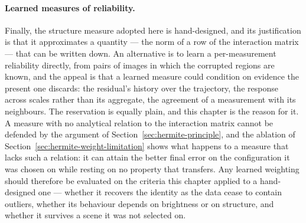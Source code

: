 \paragraph{Learned measures of reliability.}
Finally, the structure measure adopted here is hand-designed, and its
justification is that it approximates a quantity --- the norm of a row of the
interaction matrix --- that can be written down. An alternative is to learn a
per-measurement reliability directly, from pairs of images in which the
corrupted regions are known, and the appeal is that a learned measure could
condition on evidence the present one discards: the residual's history over
the trajectory, the response across scales rather than its aggregate, the
agreement of a measurement with its neighbours. The reservation is equally
plain, and this chapter is the reason for it. A measure with no analytical
relation to the interaction matrix cannot be defended by the argument of
Section~\ref{sec:hermite-principle}, and the ablation of
Section~\ref{sec:hermite-weight-limitation} shows what happens to a measure
that lacks such a relation: it can attain the better final error on the
configuration it was chosen on while resting on no property that transfers.
Any learned weighting should therefore be evaluated on the criteria this
chapter applied to a hand-designed one --- whether it recovers the identity as
the data cease to contain outliers, whether its behaviour depends on
brightness or on structure, and whether it survives a scene it was not
selected on.


